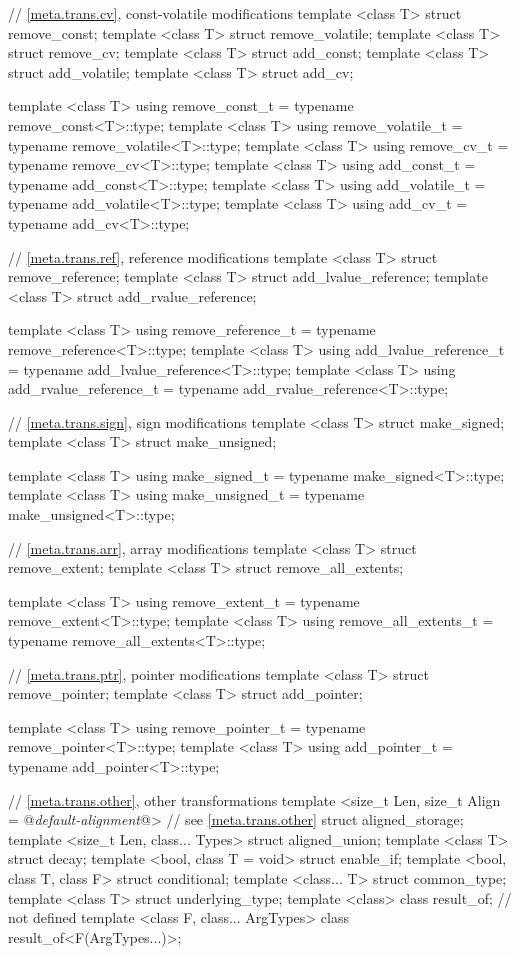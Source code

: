 \begin{codeblock}
{  // \ref{meta.trans.cv}, const-volatile modifications
  template <class T> struct remove_const;
  template <class T> struct remove_volatile;
  template <class T> struct remove_cv;
  template <class T> struct add_const;
  template <class T> struct add_volatile;
  template <class T> struct add_cv;

  template <class T>
    using remove_const_t    = typename remove_const<T>::type;
  template <class T>
    using remove_volatile_t = typename remove_volatile<T>::type;
  template <class T>
    using remove_cv_t       = typename remove_cv<T>::type;
  template <class T>
    using add_const_t       = typename add_const<T>::type;
  template <class T>
    using add_volatile_t    = typename add_volatile<T>::type;
  template <class T>
    using add_cv_t          = typename add_cv<T>::type;

  // \ref{meta.trans.ref}, reference modifications
  template <class T> struct remove_reference;
  template <class T> struct add_lvalue_reference;
  template <class T> struct add_rvalue_reference;

  template <class T>
    using remove_reference_t     = typename remove_reference<T>::type;
  template <class T>
    using add_lvalue_reference_t = typename add_lvalue_reference<T>::type;
  template <class T>
    using add_rvalue_reference_t = typename add_rvalue_reference<T>::type;

  // \ref{meta.trans.sign}, sign modifications
  template <class T> struct make_signed;
  template <class T> struct make_unsigned;

  template <class T>
    using make_signed_t   = typename make_signed<T>::type;
  template <class T>
    using make_unsigned_t = typename make_unsigned<T>::type;

  // \ref{meta.trans.arr}, array modifications
  template <class T> struct remove_extent;
  template <class T> struct remove_all_extents;

  template <class T>
    using remove_extent_t      = typename remove_extent<T>::type;
  template <class T>
    using remove_all_extents_t = typename remove_all_extents<T>::type;

  // \ref{meta.trans.ptr}, pointer modifications
  template <class T> struct remove_pointer;
  template <class T> struct add_pointer;

  template <class T>
    using remove_pointer_t = typename remove_pointer<T>::type;
  template <class T>
    using add_pointer_t    = typename add_pointer<T>::type;

  // \ref{meta.trans.other}, other transformations
  template <size_t Len,
            size_t Align = @\textit{default-alignment}@> // see \ref{meta.trans.other}
    struct aligned_storage;
  template <size_t Len, class... Types> struct aligned_union;
  template <class T> struct decay;
  template <bool, class T = void> struct enable_if;
  template <bool, class T, class F> struct conditional;
  template <class... T> struct common_type;
  template <class T> struct underlying_type;
  template <class> class result_of;   // not defined
  template <class F, class... ArgTypes> class result_of<F(ArgTypes...)>;

}
\end{codeblock}
